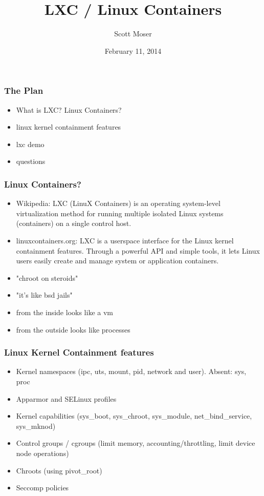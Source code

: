 \documentclass{beamer}
\author{Scott Moser}
\title{LXC / Linux Containers}
\institute{Michigan!/usr/group}
\date{February 11, 2014}
\begin{document}
\begin{frame}[t,plain]
    \titlepage
\end{frame}

\begin{frame}
   \frametitle{The Plan}
   \begin{itemize}
      \item What is LXC? Linux Containers?
      \item linux kernel containment features
      \item lxc demo
      \item questions
   \end{itemize}
\end{frame}

\begin{frame}
   \frametitle{Linux Containers?}
   \begin{itemize}
      \item Wikipedia: LXC (LinuX Containers) is an operating system-level virtualization method for running multiple isolated Linux systems (containers) on a single control host.
      \item linuxcontainers.org: LXC is a userspace interface for the Linux kernel containment features.  Through a powerful API and simple tools, it lets Linux users easily create and manage system or application containers.
      \item "chroot on steroids"
      \item "it's like bsd jails"
      \item from the inside looks like a vm
      \item from the outside looks like processes
    \end{itemize}
\end{frame}

\begin{frame}
   \frametitle{Linux Kernel Containment features}
   \begin{itemize}
      \item Kernel namespaces (ipc, uts, mount, pid, network and user). Absent: sys, proc
      \item Apparmor and SELinux profiles
      \item Kernel capabilities (sys\_boot, sys\_chroot, sys\_module, net\_bind\_service, sys\_mknod)
      \item Control groups / cgroups (limit memory, accounting/throttling, limit device node operations)
      \item Chroots (using pivot\_root)
      \item Seccomp policies
   \end{itemize}
\end{frame}
\end{document}
